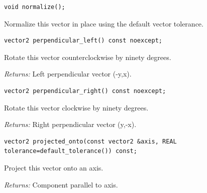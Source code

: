 \par\noindent\begin{minipage}{\linewidth}
\begin{lstlisting}[style=apireference]
void normalize();
\end{lstlisting}
{\footnotesize Normalize this vector in place using the default vector tolerance.\par}
\end{minipage}\par\vspace{1pt}
\par\noindent\begin{minipage}{\linewidth}
\begin{lstlisting}[style=apireference]
vector2 perpendicular_left() const noexcept;
\end{lstlisting}
{\footnotesize Rotate this vector counterclockwise by ninety degrees.\par}
{\footnotesize\textit{Returns:} Left perpendicular vector (-y,x).\par}
\end{minipage}\par\vspace{1pt}
\par\noindent\begin{minipage}{\linewidth}
\begin{lstlisting}[style=apireference]
vector2 perpendicular_right() const noexcept;
\end{lstlisting}
{\footnotesize Rotate this vector clockwise by ninety degrees.\par}
{\footnotesize\textit{Returns:} Right perpendicular vector (y,-x).\par}
\end{minipage}\par\vspace{1pt}
\par\noindent\begin{minipage}{\linewidth}
\begin{lstlisting}[style=apireference]
vector2 projected_onto(const vector2 &axis, REAL tolerance=default_tolerance()) const;
\end{lstlisting}
{\footnotesize Project this vector onto an axis.\par}
{\footnotesize\textit{Returns:} Component parallel to axis.\par}
\end{minipage}\par\vspace{1pt}

